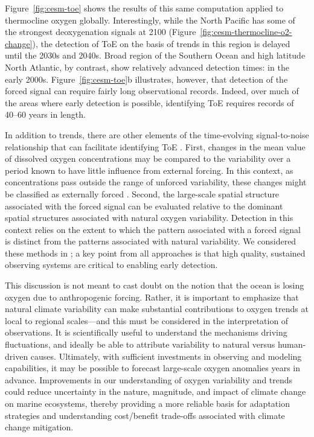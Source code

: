 \documentclass{report_chapter}
\begin{document}
Figure~\ref{fig:cesm-toe} shows the results of this same computation applied to thermocline oxygen globally.
Interestingly, while the North Pacific has some of the strongest deoxygenation signals at 2100 (Figure~\ref{fig:cesm-thermocline-o2-change}), the detection of ToE on the basis of trends in this region is delayed until the 2030s and 2040s.
Broad region of the Southern Ocean and high latitude North Atlantic, by contrast, show relatively advanced detection times: in the early 2000s.
Figure~\ref{fig:cesm-toe}b illustrates, however, that detection of the forced signal can require fairly long observational records.
Indeed, over much of the areas where early detection is possible, identifying ToE requires records of 40--60 years in length.

In addition to trends, there are other elements of the time-evolving signal-to-noise relationship that can facilitate identifying ToE \citep{Santer-Bruggemann-etal-1994}.
First, changes in the mean value of dissolved oxygen concentrations may be compared to the variability over a period known to have little influence from external forcing.
In this context, as concentrations pass outside the range of unforced variability, these changes might be classified as externally forced \citep{Christian-2014}.
Second, the large-scale spatial structure associated with the forced signal can be evaluated relative to the dominant spatial structures associated with natural oxygen variability.
Detection in this context relies on the extent to which the pattern associated with a forced signal is distinct from the patterns associated with natural variability.
We considered these methods in \citet{Long-Deutsch-etal-2016}; a key point from all approaches is that high quality, sustained observing systems are critical to enabling early detection.

This discussion is not meant to cast doubt on the notion that the ocean is losing oxygen due to anthropogenic forcing.
Rather, it is important to emphasize that natural climate variability can make substantial contributions to oxygen trends at local to regional scales---and this must be considered in the interpretation of observations.
It is scientifically useful to understand the mechanisms driving \OO{} fluctuations, and ideally be able to attribute variability to natural versus human-driven causes.
Ultimately, with sufficient investments in observing and modeling capabilities, it may be possible to forecast large-scale oxygen anomalies years in advance.
Improvements in our understanding of oxygen variability and trends could reduce uncertainty in the nature, magnitude, and impact of climate change on marine ecosystems, thereby providing a more reliable basis for adaptation strategies and understanding cost/benefit trade-offs associated with climate change mitigation.
\end{document}

